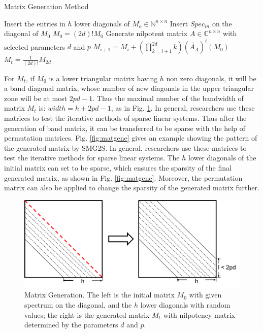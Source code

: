 \begin{algorithm*}[htbp]{}
	\caption{Matrix Generation Method}   
	\label{alg:matgen}   
	\begin{algorithmic}[1]
		\State Insert the entries in $h$ lower diagonals of $M_o \in \mathbb{N}^{n \times n}$
		\State Insert $Spec_{in}$ on the diagonal of $M_0$
		\State $M_0=(2d)!M_0$
		\State Generate nilpotent matrix $A \in \mathbb{C}^{n\times n}$ with selected parameters $d$ and $p$
		\State $M_{i+1}=M_i+(\prod_{k=i+1}^{2d}k)(\widetilde{A_A})^i(M_0)$
		\EndFor 
		\State $M_t = \frac{1}{(2d)!}M_{2d}$
		\EndFunction
	\end{algorithmic}
\end{algorithm*}

For $M_t$, if $M_0$ is a lower triangular matrix having $h$ non zero diagonals, it will be a band diagonal matrix, whose number of new diagonals in the upper triangular zone will be at most $2pd-1$. Thus the maximal number of the bandwidth of matrix $M_t$ is: $width = h + 2pd-1$, as in Fig. \ref{fig:matgen}. In general, researchers use these matrices to test the iterative methods of sparse linear systems. Thus after the generation of band matrix, it can be transferred to be sparse with the help of permutation matrices. Fig. \ref{fig:matgene} gives an example showing the pattern of the generated matrix by SMG2S. In general, researchers use these matrices to test the iterative methods for sparse linear systems. The $h$ lower diagonals of the initial matrix can set to be sparse, which ensures the sparsity of the final generated matrix, as shown in Fig. \ref{fig:matgene}. Moreover, the permutation matrix can also be applied to change the sparsity of the generated matrix further.

\begin{figure}[t]
	\centering
	\includegraphics[width=5.8in]{fig/matgen.pdf}
	\caption{Matrix Generation. The left is the initial matrix $M_0$ with given spectrum on the diagonal, and the $h$ lower diagonals with random values; the right is the generated matrix $M_t$ with nilpotency matrix determined by the parameters $d$ and $p$.}
	\label{fig:matgen}
\end{figure}

